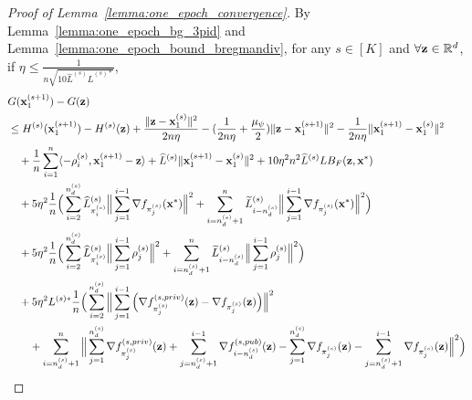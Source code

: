 \begin{proof}[Proof of Lemma~\ref{lemma:one_epoch_convergence}]
    By Lemma~\ref{lemma:one_epoch_bg_3pid} and Lemma~\ref{lemma:one_epoch_bound_bregmandiv}, for any $s \in [K]$ and $\forall {\mathbf{z}}\in \mathbb{R}^d$, if $\eta \leq \frac{1}{n\sqrt{10 \widehat{L}^{(s)} \widehat{L}^{(s)*}}}$,
    \begin{align}
    \label{eq:one_epoch_convergence_interm}
        &G({\mathbf{x}}_1^{(s+1)}) - G({\mathbf{z}})\\
        \nonumber
        &\leq H^{(s)}({\mathbf{x}}_1^{(s+1)}) - H^{(s)}({\mathbf{z}})
        + \frac{\|{\mathbf{z}} - {\mathbf{x}}_1^{(s)}\|^2}{2n \eta} - (\frac{1}{2n \eta} + \frac{\mu_\psi}{2}) \|{\mathbf{z}} - {\mathbf{x}}_1^{(s+1)}\|^2
        - \frac{1}{2n \eta}\|{\mathbf{x}}_1^{(s+1)} - {\mathbf{x}}_1^{(s)}\|^2\\
        \nonumber
        &\quad + \frac{1}{n}\sum_{i=1}^{n}\langle -\rho_i^{(s)}, {\mathbf{x}}_1^{(s+1)} - {\mathbf{z}}\rangle
        + \widehat{L}^{(s)} \|{\mathbf{x}}_{1}^{(s+1)} - {\mathbf{x}}_1^{(s)}\|^2 
        + 10\eta^2 n^2 \widehat{L}^{(s)} L B_F({\mathbf{z}}, {\mathbf{x}}^*)\\
        \nonumber
        &\quad 
        + 5 \eta^2 \frac{1}{n} \Big(\sum_{i=2}^{n_d^{(s)}}\widehat{L}_{\pi_i^{(s)}}^{(s)}\Big\| \sum_{j=1}^{i-1} \nabla f_{\pi_j^{(s)}}({\mathbf{x}}^*)\Big\|^2
        + \sum_{i=n_d^{(s)}+1}^{n}\widetilde{L}_{i-n_d^{(s)}}^{(s)}\Big\| \sum_{j=1}^{i-1}\nabla f_{\pi_j^{(s)}}({\mathbf{x}}^*)\Big\|^2 \Big)\\
        \nonumber
        &\quad 
        + 5\eta^2 \frac{1}{n} \Big( \sum_{i=2}^{n_d^{(s)}} \widehat{L}_{\pi_i^{(s)}}^{(s)} \Big\| \sum_{j=1}^{i-1} \rho_j^{(s)}\Big\|^2
        + \sum_{i=n_d^{(s)}+1}^{n} \widetilde{L}_{i-n_d^{(s)}}^{(s)}\Big\| \sum_{j=1}^{i-1} \rho_j^{(s)}\Big\|^2\Big)\\
    \nonumber
        &\quad + 5\eta^2 L^{(s)*} \frac{1}{n}\Big(\sum_{i=2}^{n_d^{(s)}}
        \Big\| \sum_{j=1}^{i-1} \Big( \nabla f_{\pi_j^{(s)}}^{(s, priv)}({\mathbf{z}}) - \nabla f_{\pi_j^{(s)}}({\mathbf{z}})\Big) \Big\|^2
        \\
        \nonumber
        &\quad \quad + \sum_{i=n_d^{(s)} + 1}^{n} \Big\| \sum_{j=1}^{n_d^{(s)}} \nabla f_{\pi_j^{(s)}}^{(s, priv)}({\mathbf{z}}) + \sum_{j=n_d^{(s)}+1}^{i-1} \nabla f_{i-n_d^{(s)}}^{(s, pub)}({\mathbf{z}})
            - \sum_{j=1}^{n_d^{(s)}} \nabla f_{\pi_j^{(s)}}({\mathbf{z}}) - \sum_{j=n_d^{(s)}+1}^{i-1} \nabla f_{\pi_j^{(s)}}({\mathbf{z}})
        \Big\|^2
        \Big)
    \end{align}


\end{proof}
